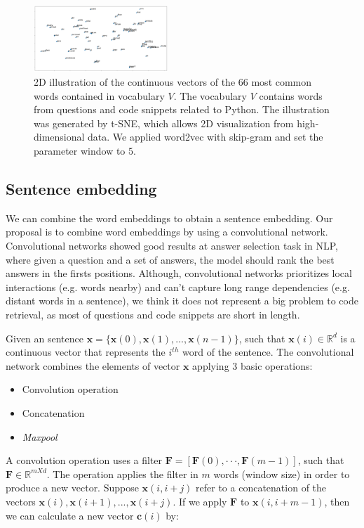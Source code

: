 \documentclass[sigconf]{acmart}
\begin{document}
\begin{figure}[H]
\includegraphics[width=0.45\textwidth]{figuras/code_tsne.png}
\caption{2D illustration of the continuous vectors of the 66 most common words contained in vocabulary $V$. The vocabulary $V$ contains words from questions and code snippets related to Python. The illustration was generated by t-SNE, which allows 2D visualization from high-dimensional data. We applied word2vec with skip-gram and set the parameter window to $5$.}

\label{fig:tsne-code-snippet-python}
\end{figure}

\subsection{Sentence embedding}

We can combine the word embeddings to obtain a sentence embedding. Our proposal is to combine word embeddings by using a convolutional network. Convolutional networks showed good results at answer selection task in NLP, where given a question and a set of answers, the model should rank the best answers in the firsts positions. Although, convolutional networks prioritizes local interactions (e.g. words nearby) and can't capture long range dependencies (e.g. distant words in a sentence), we think it does not represent a big problem to code retrieval, as most of questions and code snippets are short in length.

Given an sentence $\bm{x} = \{ \bm{x}(0), \bm{x}(1), . . ., \bm{x}(n - 1) \}$, such that $\bm{x}(i) \in \mathbb{R}^{d}$ is a continuous vector that represents the $i^{th}$ word of the sentence. The convolutional network combines the elements of vector $\bm{x}$ applying 3 basic operations:

\begin{itemize}
    \item Convolution operation
    \item Concatenation
    \item \textit{Maxpool}
\end{itemize}

A convolution operation uses a filter $\bm{F}  = [\bm{F}(0),· · ·, \bm{F}(m - 1)]$, such that $\bm{F} \in \mathbb{R}^{m X d}$. The operation applies the filter in $m$ words (window size) in order to produce a new vector. Suppose $\bm{x}(i, i + j)$ refer to a concatenation of the vectors $\bm{x}(i), \bm{x}(i + 1), . . ., \bm{x}(i + j)$. If we apply $\bm{F}$ to $\bm{x}(i, i + m - 1)$, then we can calculate a new vector $\bm{c}(i)$ by:
\end{document}
